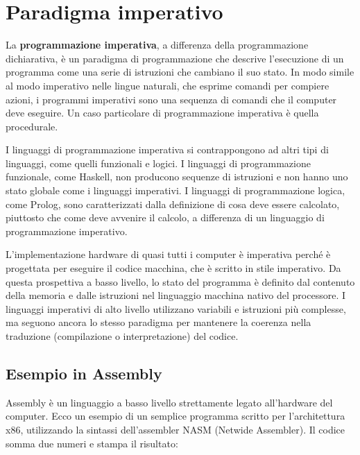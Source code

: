 \documentclass[
  letterpaper,
]{scrbook}
\begin{document}
\section{Paradigma imperativo}\label{paradigma-imperativo}

La \textbf{programmazione imperativa}, a differenza della programmazione
dichiarativa, è un paradigma di programmazione che descrive l'esecuzione
di un programma come una serie di istruzioni che cambiano il suo stato.
In modo simile al modo imperativo nelle lingue naturali, che esprime
comandi per compiere azioni, i programmi imperativi sono una sequenza di
comandi che il computer deve eseguire. Un caso particolare di
programmazione imperativa è quella procedurale.

I linguaggi di programmazione imperativa si contrappongono ad altri tipi
di linguaggi, come quelli funzionali e logici. I linguaggi di
programmazione funzionale, come Haskell, non producono sequenze di
istruzioni e non hanno uno stato globale come i linguaggi imperativi. I
linguaggi di programmazione logica, come Prolog, sono caratterizzati
dalla definizione di cosa deve essere calcolato, piuttosto che come deve
avvenire il calcolo, a differenza di un linguaggio di programmazione
imperativo.

L'implementazione hardware di quasi tutti i computer è imperativa perché
è progettata per eseguire il codice macchina, che è scritto in stile
imperativo. Da questa prospettiva a basso livello, lo stato del
programma è definito dal contenuto della memoria e dalle istruzioni nel
linguaggio macchina nativo del processore. I linguaggi imperativi di
alto livello utilizzano variabili e istruzioni più complesse, ma seguono
ancora lo stesso paradigma per mantenere la coerenza nella traduzione
(compilazione o interpretazione) del codice.

\subsection{Esempio in Assembly}\label{esempio-in-assembly}

Assembly è un linguaggio a basso livello strettamente legato
all'hardware del computer. Ecco un esempio di un semplice programma
scritto per l'architettura x86, utilizzando la sintassi dell'assembler
NASM (Netwide Assembler). Il codice somma due numeri e stampa il
risultato:
\end{document}
